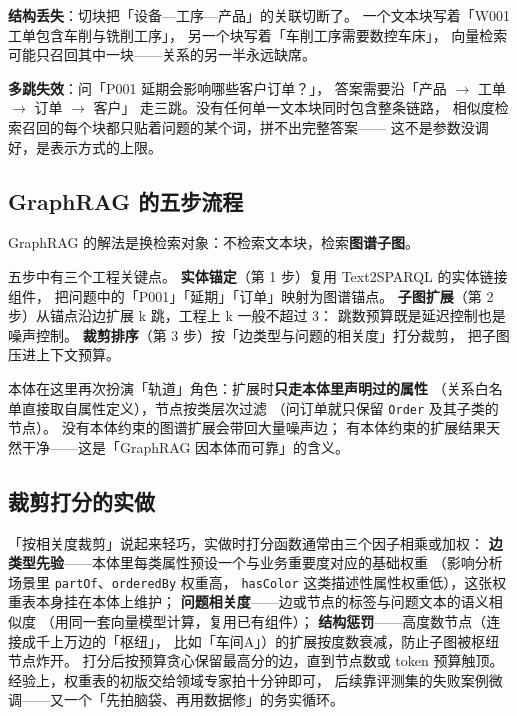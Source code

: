 \textbf{结构丢失}：切块把「设备—工序—产品」的关联切断了。
一个文本块写着「W001 工单包含车削与铣削工序」，
另一个块写着「车削工序需要数控车床」，
向量检索可能只召回其中一块——关系的另一半永远缺席。

\textbf{多跳失效}：问「P001 延期会影响哪些客户订单？」，
答案需要沿「产品 \(\rightarrow\) 工单 \(\rightarrow\) 订单 \(\rightarrow\) 客户」
走三跳。没有任何单一文本块同时包含整条链路，
相似度检索召回的每个块都只贴着问题的某个词，拼不出完整答案——
这不是参数没调好，是表示方式的上限。

\subsection{GraphRAG 的五步流程}

GraphRAG 的解法是换检索对象：不检索文本块，检索\textbf{图谱子图}。



五步中有三个工程关键点。
\textbf{实体锚定}（第 1 步）复用 Text2SPARQL 的实体链接组件，
把问题中的「P001」「延期」「订单」映射为图谱锚点。
\textbf{子图扩展}（第 2 步）从锚点沿边扩展 k 跳，工程上 k 一般不超过 3：
跳数预算既是延迟控制也是噪声控制。
\textbf{裁剪排序}（第 3 步）按「边类型与问题的相关度」打分裁剪，
把子图压进上下文预算。

本体在这里再次扮演「轨道」角色：扩展时\textbf{只走本体里声明过的属性}
（关系白名单直接取自属性定义），节点按类层次过滤
（问订单就只保留 \texttt{Order} 及其子类的节点）。
没有本体约束的图谱扩展会带回大量噪声边；
有本体约束的扩展结果天然干净——这是「GraphRAG 因本体而可靠」的含义。

\subsection{裁剪打分的实做}

「按相关度裁剪」说起来轻巧，实做时打分函数通常由三个因子相乘或加权：
\textbf{边类型先验}——本体里每类属性预设一个与业务重要度对应的基础权重
（影响分析场景里 \texttt{partOf}、\texttt{orderedBy} 权重高，
\texttt{hasColor} 这类描述性属性权重低），这张权重表本身挂在本体上维护；
\textbf{问题相关度}——边或节点的标签与问题文本的语义相似度
（用同一套向量模型计算，复用已有组件）；
\textbf{结构惩罚}——高度数节点（连接成千上万边的「枢纽」，
比如「车间A」）的扩展按度数衰减，防止子图被枢纽节点炸开。
打分后按预算贪心保留最高分的边，直到节点数或 token 预算触顶。
经验上，权重表的初版交给领域专家拍十分钟即可，
后续靠评测集的失败案例微调——又一个「先拍脑袋、再用数据修」的务实循环。


